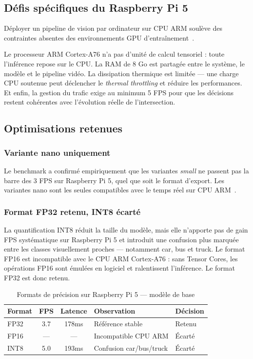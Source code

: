 \subsection{Défis spécifiques du Raspberry Pi 5}

Déployer un pipeline de vision par ordinateur
sur CPU ARM soulève des contraintes absentes
des environnements GPU d'entraînement~\cite{wang2025}.

Le processeur ARM Cortex-A76 n'a pas d'unité
de calcul tensoriel : toute l'inférence repose
sur le CPU. La RAM de 8 Go est partagée entre
le système, le modèle et le pipeline vidéo.
La dissipation thermique est limitée — une
charge CPU soutenue peut déclencher le
\textit{thermal throttling} et réduire les
performances. Et enfin, la gestion du trafic
exige au minimum 5 FPS pour que les décisions
restent cohérentes avec l'évolution réelle
de l'intersection.

\subsection{Optimisations retenues}

\subsubsection{Variante nano uniquement}

Le benchmark a confirmé empiriquement que
les variantes \textit{small} ne passent pas
la barre des 3 FPS sur Raspberry Pi 5, quel
que soit le format d'export. Les variantes
nano sont les seules compatibles avec le
temps réel sur CPU ARM~\cite{wang2025}.

\subsubsection{Format FP32 retenu, INT8 écarté}

La quantification INT8 réduit la taille du
modèle, mais elle n'apporte pas de gain FPS
systématique sur Raspberry Pi 5 et introduit
une confusion plus marquée entre les classes
visuellement proches — notamment car, bus et
truck. Le format FP16 est incompatible avec
le CPU ARM Cortex-A76 : sans Tensor Cores,
les opérations FP16 sont émulées en logiciel
et ralentissent l'inférence. Le format FP32
est donc retenu.

\begin{table}[H]
\centering
\caption{Formats de précision sur
         Raspberry Pi 5 — modèle de base}
\begin{tabularx}{\textwidth}{lccXl}
\toprule
\textbf{Format} &
\textbf{FPS} &
\textbf{Latence} &
\textbf{Observation} &
\textbf{Décision} \\
\midrule
FP32 & 3.7 & 178ms &
Référence stable &
Retenu \\
FP16 & — & — &
Incompatible CPU ARM &
Écarté \\
INT8 & 5.0 & 193ms &
Confusion car/bus/truck &
Écarté \\
\bottomrule
\end{tabularx}
\label{tab:formats}
\end{table}

